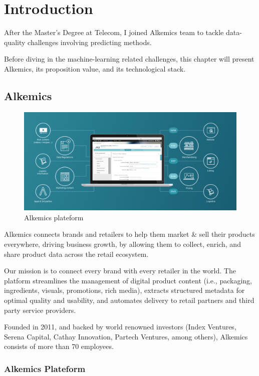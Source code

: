 \chapter{Introduction}

After the Master's Degree at Telecom, I joined Alkemics team to tackle data-quality challenges involving predicting methods. 

Before diving in the machine-learning related challenges, this chapter will present Alkemics, its proposition value, and its technological stack.

\section{Alkemics}

\begin{figure}[H]
\centering
\includegraphics[scale=0.35]{./images/introduction/alkemics_website_global.png}
\caption{Alkemics plateform}
\end{figure}

Alkemics connects brands and retailers to help them market \& sell their products everywhere, driving business growth, by allowing them to collect, enrich, and share product data across the retail ecosystem.

Our mission is to connect every brand with every retailer in the world. The platform streamlines the management of digital product content (i.e., packaging, ingredients, visuals, promotions, rich media), extracts structured metadata for optimal quality and usability, and automates delivery to retail partners and third party service providers.

Founded in 2011, and backed by world renowned investors (Index Ventures, Serena Capital, Cathay Innovation, Partech Ventures, among others), Alkemics consists of more than 70 employees.


\subsection{Alkemics Plateform}

